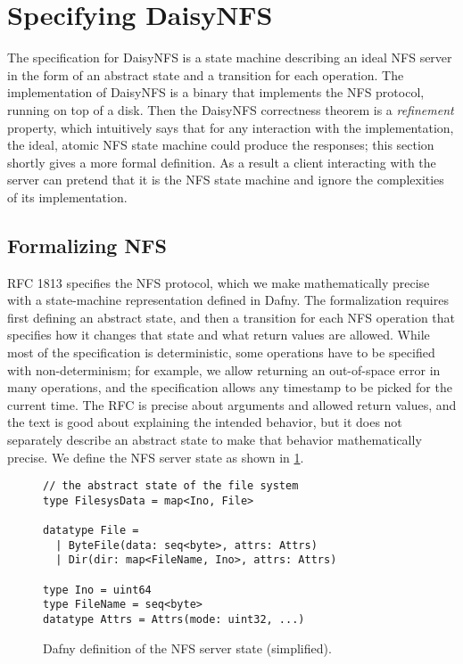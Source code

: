 \section{Specifying DaisyNFS}%
\label{sec:daisy:spec}

The specification for DaisyNFS is a state machine describing an ideal NFS server in
the form of an abstract state and a transition for each operation. The
implementation of DaisyNFS is a binary  that implements the NFS
protocol, running on top of a
disk. Then the DaisyNFS correctness
theorem is a \emph{refinement} property, which intuitively says that
for any interaction with the
implementation, the ideal, atomic NFS state machine could produce the responses;
this section shortly gives a more formal definition.
As a result a client interacting with the server can pretend
that it is the NFS state machine and ignore the complexities of its
implementation.

\subsection{Formalizing NFS}%
\label{sec:daisy:nfs}

RFC 1813 specifies the NFS protocol, which we make mathematically precise with a
state-machine representation defined in Dafny.
The formalization requires first
defining an abstract state, and then a transition for each
NFS operation that specifies how it changes that state and what return
values are allowed. While most of the specification is deterministic,
some operations have to be specified with non-determinism; for
example, we allow returning an out-of-space error in many operations,
and the specification allows any timestamp to be picked for the
current time. The RFC is precise about arguments and allowed return
values, and the text is good about explaining the intended behavior,
but it does not separately describe an abstract state to make that behavior
mathematically precise.  We define
the NFS server state as shown in \cref{fig:dafny-state}.

\begin{figure}[ht!]
\begin{verbatim}
// the abstract state of the file system
type FilesysData = map<Ino, File>

datatype File =
  | ByteFile(data: seq<byte>, attrs: Attrs)
  | Dir(dir: map<FileName, Ino>, attrs: Attrs)

type Ino = uint64
type FileName = seq<byte>
datatype Attrs = Attrs(mode: uint32, ...)
\end{verbatim}
\caption{Dafny definition of the NFS server state (simplified).}
\label{fig:dafny-state}
\end{figure}

